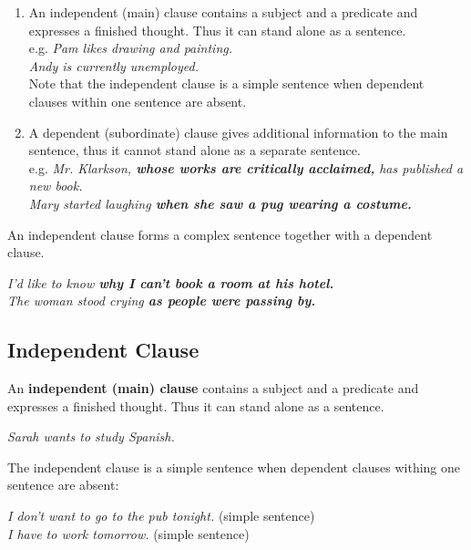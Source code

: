 \documentclass[hidelinks,10pt,a4paper]{article}
\begin{document}
\begin{enumerate}[label=(\alph*)]
	\item An independent (main) clause contains a subject and a predicate and expresses a finished thought. Thus it can stand alone as a sentence.\\
		e.g. \textit{Pam likes drawing and painting.\\
		Andy is currently unemployed.}\\

		Note that the independent clause is a simple sentence when dependent clauses within one sentence are absent.

	\item A dependent (subordinate) clause gives additional information to the main sentence, thus it cannot stand alone as a separate sentence.\\
		e.g. \textit{Mr. Klarkson, \textbf{whose works are critically acclaimed,} has published a new book. \\
		Mary started laughing \textbf{when she saw a pug wearing a costume.} }
\end{enumerate}

An independent clause forms a complex sentence together with a dependent clause.

\begin{center}
	\textit{I'd like to know \textbf{why I can't book a room at his hotel.}\\
	The woman stood crying \textbf{as people were passing by.} }
\end{center}

\subsection{Independent Clause}
An \textbf{independent (main) clause} contains a subject and a predicate and expresses a finished thought. Thus it can stand alone as a sentence.

\begin{center}
	\textit{Sarah wants to study Spanish.}
\end{center}

The independent clause is a simple sentence when dependent clauses withing one sentence are absent:

\begin{center}
	\textit{I don't want to go to the pub tonight.} (simple sentence)\\
	\textit{I have to work tomorrow.} (simple sentence)
\end{center}
\end{document}
